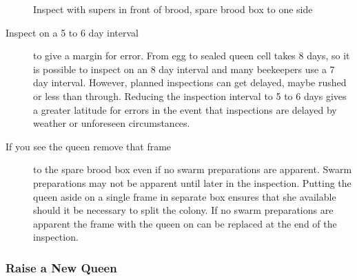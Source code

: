 \begin{figure}[H]
\centering
{}
\caption{Inspect with supers in front of brood, spare brood box to one side}%
\end{figure}

\begin{description}
  \item [Inspect on a 5 to 6 day interval] to give a margin for error.
    From egg to sealed queen cell takes 8 days, so it is possible to inspect on an 8 day interval and many beekeepers use a 7 day interval.
    However, planned inspections can get delayed, maybe rushed or less than through.
    Reducing the inspection interval to 5 to 6 days gives a greater latitude for errors
    in the event that inspections are delayed by weather or unforeseen circumstances.
  \item [If you see the queen remove that frame] to the spare brood box even if no swarm preparations are apparent.
    Swarm preparations may not be apparent until later in the inspection.
    Putting the queen aside on a single frame in separate box ensures that she available should it be necessary to split the colony.
    If no swarm preparations are apparent the frame with the queen on can be replaced at the end of the inspection.
\end{description}

\subsubsection{Raise a New Queen}

